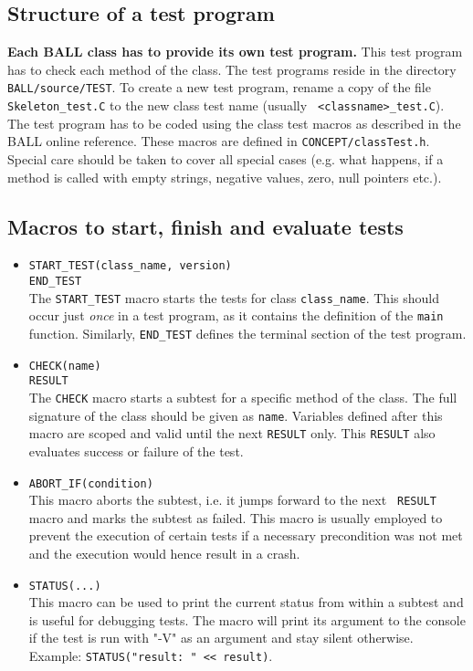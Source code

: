 \documentclass[a4paper,10pt]{article}
\begin{document}
\subsection{Structure of a test program}

{\bf Each BALL class has to provide its own test program.} This test program has to check
each method of the class. The test programs reside in the directory
{\tt BALL/source/TEST}. To create a new test program, rename a copy of the file
{\tt Skeleton\_test.C} to the new class test name (usually {\tt
<classname>\_test.C}). The test program has to be coded using the class test
macros as described in the BALL online reference. These macros are
defined in {\tt CONCEPT/classTest.h}. Special care should be taken
to cover all special cases (e.g. what happens, if a method is called with
empty strings, negative values, zero, null pointers etc.). 

\subsection{Macros to start, finish and evaluate tests}
\begin{itemize}
	\item {\tt START\_TEST(class\_name, version)}\\
	{\tt END\_TEST}\\
		The {\tt START\_TEST} macro starts the tests for class {\tt class\_name}. This should occur just
		\emph{once} in a test program, as it contains the definition of the {\tt main}
		function. Similarly, {\tt END\_TEST} defines the terminal section of the test program.
	
	\item {\tt CHECK(name)}\\
	{\tt RESULT}\\
		The {\tt CHECK} macro starts a subtest for a specific method of the class. The full
		signature of the class should be given as {\tt name}.
		Variables defined after this macro are scoped and valid until the next
		{\tt RESULT} only. This {\tt RESULT} also evaluates success or failure of the test.

	\item {\tt ABORT\_IF(condition)}\\
		This macro aborts the subtest, i.e. it jumps forward to the next {\tt
		RESULT} macro and marks the subtest as failed. This macro is usually employed
		to prevent the execution of certain tests if a necessary precondition was
		not met and the execution would hence result in a crash.

	\item {\tt STATUS(...)}\\
		This macro can be used to print the current status from within a subtest
		and is useful for debugging tests. The macro will print its argument to the
		console if the test is run with "-V" as an argument and stay silent
		otherwise. Example: {\tt STATUS("result: " << result)}.

\end{itemize}
\end{document}

